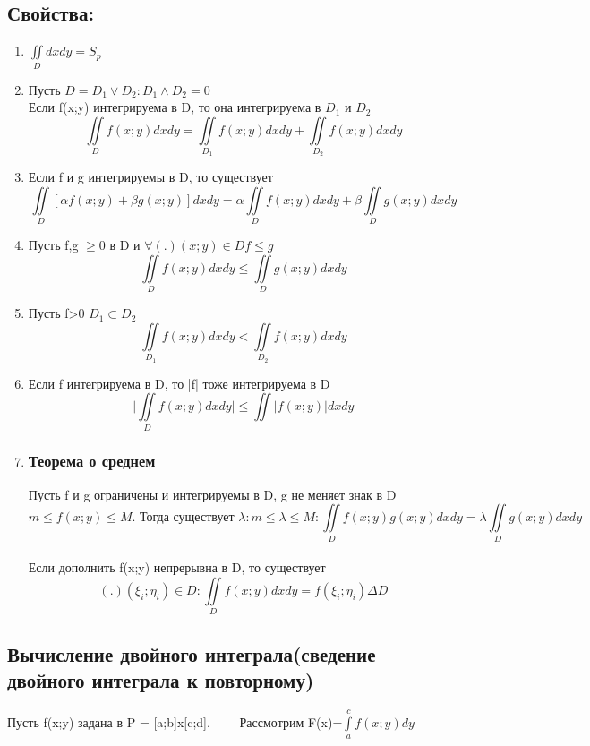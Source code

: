 \documentclass[12pt]{article}
\let\oldint\int
\let\oldiint\iint
\renewcommand{\int}{\oldint\limits}
\renewcommand{\iint}{\oldiint\limits}
\begin{document}
  \subsection*{Свойства:}
  \begin{enumerate}
    \item $\iint_D dxdy=S_p$
    \item Пусть $D=D_1 \lor D_2: D_1\land D_2 =0$\\
    Если f(x;y) интегрируема в D, то она интегрируема в $D_1$ и $D_2$
    \[\iint_D f(x;y) dxdy=\iint_{D_1}f(x;y)dxdy+\iint_{D_2}f(x;y)dxdy\]
    \item Если f и g интегрируемы в D, то существует 
    \[\iint_D [\alpha f(x;y)+ \beta g(x;y)]dxdy=\alpha \iint_D f(x;y)dxdy+ \beta \iint_D g(x;y)dxdy\]
    \item Пусть f,g $\geq 0$ в D и $\forall (.) (x;y) \in D f\leq g$\\
    \[\iint_D f(x;y)dxdy\leq \iint_D g(x;y)dxdy\]
    \item Пусть f>0 $D_1 \subset D_2$
    \[\iint_{D_1} f(x;y)dxdy<\iint_{D_2} f(x;y)dxdy\]
    \item Если f интегрируема в D, то |f| тоже интегрируема в D
    \[\Big| \iint_D f(x;y)dxdy \Big| \leq \iint|f(x;y)|dxdy\]
    \item  
    \subsubsection*{Теорема о среднем}\label{th:8.12.1}
    \par\noindent
    Пусть f и g ограничены и интегрируемы в D, g не меняет знак в D
    \[m\leq f(x;y)\leq M. \text{ Тогда существует }\lambda: m\leq \lambda \leq M: 
    \iint_D f(x;y) g(x;y)dxdy=\lambda \iint_D g(x;y)dxdy\]\\
    Если дополнить f(x;y) непрерывна в D, то существует
    \[(.) (\xi_i;\eta_i) \in D: \iint_D f(x;y)dxdy=f (\xi_i;\eta_i) \Delta D\]
  \end{enumerate}
  \subsection{Вычисление двойного интеграла(сведение двойного интеграла к повторному)}
  Пусть f(x;y) задана в P = [a;b]x[c;d]. $\hspace{20pt}$ Рассмотрим F(x)=$\int_{a}^{c}f(x;y)dy$
\end{document}
